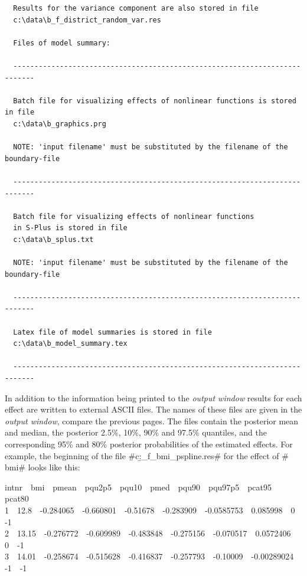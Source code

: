 \begin{verbatim}
  Results for the variance component are also stored in file
  c:\data\b_f_district_random_var.res

  Files of model summary:

  ---------------------------------------------------------------------------

  Batch file for visualizing effects of nonlinear functions is stored in file
  c:\data\b_graphics.prg

  NOTE: 'input filename' must be substituted by the filename of the boundary-file

  ---------------------------------------------------------------------------

  Batch file for visualizing effects of nonlinear functions
  in S-Plus is stored in file
  c:\data\b_splus.txt

  NOTE: 'input filename' must be substituted by the filename of the boundary-file

  ---------------------------------------------------------------------------

  Latex file of model summaries is stored in file
  c:\data\b_model_summary.tex

  ---------------------------------------------------------------------------
\end{verbatim}
\normalsize

In addition to the information being printed to the {\em output
window} results for each effect are written to external ASCII
files. The names of these files are given in the {\em output
window}, compare the previous pages. The files contain the
posterior mean and median, the posterior 2.5\%, 10\%, 90\% and
97.5\% quantiles, and the corresponding 95\% and 80\% posterior
probabilities of the estimated effects. For example, the beginning
of the file #c:\data\b_f_bmi_pspline.res# for the effect of # bmi#
looks like this:

{\footnotesize
 intnr \,\, bmi \,\, pmean \,\, pqu2p5 \,\, pqu10 \,\, pmed \,\, pqu90 \,\, pqu97p5 \,\, pcat95 \,\, pcat80\\
 1 \,\, 12.8 \,\, -0.284065 \,\, -0.660801 \,\, -0.51678 \,\, -0.283909 \,\, -0.0585753 \,\, 0.085998 \,\, 0 \,\, -1\\
 2 \,\, 13.15 \,\, -0.276772 \,\, -0.609989 \,\, -0.483848 \,\, -0.275156 \,\, -0.070517 \,\, 0.0572406 \,\, 0 \,\, -1\\
 3 \,\, 14.01 \,\, -0.258674 \,\, -0.515628 \,\, -0.416837 \,\, -0.257793 \,\, -0.10009 \,\, -0.00289024 \,\, -1 \,\, -1}

